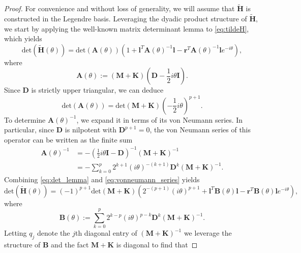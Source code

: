 \documentclass[10pt,a4paper]{amsart}
\begin{document}
\begin{proof}
    For convenience and without loss of generality, we will assume that $\tilde{\mathbf{H}}$ is constructed in the Legendre basis. Leveraging the dyadic product structure of $\tilde{\mathbf{H}}$, we start by applying the well-known matrix determinant lemma to \cref{eq:tildeH}, which yields
\begin{equation}
    \text{det}(\tilde{\mathbf{H}}(\theta)) =
    \text{det}(\mathbf{A}(\theta))
    \left(1 + \mathbf{l}^T\mathbf{A}(\theta)^{-1} \mathbf{l} - \mathbf{r}^T\mathbf{A}(\theta)^{-1}\mathbf{l}e^{-i\theta}\right),
    \label{eq:det_lemma}
\end{equation}
where
\begin{equation}
    \mathbf{A}(\theta) := (\mathbf{M} + \mathbf{K})\left(\mathbf{D} -\frac{1}{2}i\theta \mathbf{I}\right).
\end{equation}
Since $\mathbf{D}$ is strictly upper triangular, we can deduce
\begin{equation}
    \text{det}(\mathbf{A}(\theta))
    = 
    \text{det}(\mathbf{M} +\mathbf{K})\left(-\frac{1}{2}i\theta\right)^{p+1}.
\end{equation}
To determine $\mathbf{A}(\theta)^{-1}$, we expand it in terms of its von Neumann series. In particular, since $\mathbf{D}$ is nilpotent with $\mathbf{D}^{p+1} = 0$, the von Neumann series of this operator can be written as the finite sum
\begin{align}
    \mathbf{A}(\theta)^{-1}
    &= -\left(\frac{1}{2}i\theta \mathbf{I} - \mathbf{D}\right)^{-1}(\mathbf{M}+\mathbf{K})^{-1} \\
    &=
    -\sum_{k=0}^{p} 2^{k+1}(i\theta)^{-(k+1)} \mathbf{D}^k (\mathbf{M}+\mathbf{K})^{-1}.
    \label{eq:vonneumann_series}
\end{align}
Combining \cref{eq:det_lemma} and \cref{eq:vonneumann_series} yields
\begin{equation}
     \text{det}(\tilde{\mathbf{H}}(\theta)) =
    (-1)^{p+1}\text{det}(\mathbf{M}+\mathbf{K})
    \left(2^{-(p+1)}(i\theta)^{p+1} + \mathbf{l}^T\mathbf{B}(\theta) \mathbf{l} - \mathbf{r}^T\mathbf{B}(\theta)\mathbf{l}e^{-i\theta}\right),
\end{equation}
where
\begin{equation}
    \mathbf{B}(\theta) := \sum_{k=0}^{p} 2^{k-p}(i\theta)^{p-k} \mathbf{D}^k (\mathbf{M}+\mathbf{K})^{-1}.
\end{equation}
Letting $q_j$ denote the $j$th diagonal entry of $(\mathbf{M}+\mathbf{K})^{-1}$ we leverage the structure of $\mathbf{B}$ and the fact $\mathbf{M} + \mathbf{K}$ is diagonal to find that

\end{proof}
\end{document}
